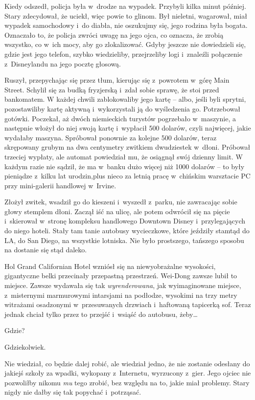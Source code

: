 \documentclass[oneside,polish,11pt,rmheadings]{mwbk}
\begin{document}
Kiedy odszedł, policja była w~drodze na wypadek. Przybyli kilka minut później. Stary zdecydował, że uciekł, więc powie to glinom. Był nieletni, wagarował, miał wypadek samochodowy i~do diabła, nie oszukujmy się, jego rodzina była bogata. Oznaczało to, że policja zwróci uwagę na jego ojca, co oznacza, że zrobią wszystko, co w~ich mocy, aby go zlokalizować. Gdyby jeszcze nie dowiedzieli się, gdzie jest jego telefon, szybko wiedzieliby, przejrzeliby logi i~znaleźli połączenie z~Disneylandu na jego pocztę głosową. 


Ruszył, przepychając się przez tłum, kierując się z~powrotem w~górę Main Street. Schylił się za budką fryzjerską i~zdał sobie sprawę, że stoi przed bankomatem. W każdej chwili zablokowaliby jego kartę -- albo, jeśli byli sprytni, pozostawiliby kartę aktywną i~wykorzystali ją do wyśledzenia go. Potrzebował gotówki. Poczekał, aż dwóch niemieckich turystów pogrzebało w~maszynie, a następnie włożył do niej swoją kartę i~wypłacił 500 dolarów, czyli najwięcej, jakie wydałaby maszyna. Spróbował ponownie za kolejne 500 dolarów, teraz skrępowany grubym na dwa centymetry zwitkiem dwudziestek w~dłoni. Próbował trzeciej wypłaty, ale automat powiedział mu, że osiągnął swój dzienny limit. W każdym razie nie sądził, że ma w~banku dużo więcej niż 1000 dolarów -- to były pieniądze z~kilku lat urodzin,plus nieco za letnią pracę w~chińskim warsztacie PC przy mini-galerii handlowej w~Irvine. 


Złożył zwitek, wsadził go do kieszeni i~wyszedł z~parku, nie zawracając sobie głowy stemplem dłoni. Zaczął iść na ulicę, ale potem odwrócił się na pięcie i~skierował w~stronę kompleksu handlowego Downtown Disney i~przylegających do niego hoteli. Stały tam tanie autobusy wycieczkowe, które jeździły stamtąd do LA, do San Diego, na wszystkie lotniska. Nie było prostszego, tańszego sposobu na dostanie się stąd daleko. 


Hol Grand Californian Hotel wzniósł się na niewyobrażalne wysokości, gigantyczne belki przecinały przepastną przestrzeń. Wei-Dong zawsze lubił to miejsce. Zawsze wydawała się tak \textit{wyrenderowana}, jak wyimaginowane miejsce, z~misternymi marmurowymi intarsjami na podłodze, wysokimi na trzy metry witrażami osadzonymi w~przesuwanych drzwiach i~haftowaną tapicerką sof. Teraz jednak chciał tylko przez to przejść i~wsiąść do autobusu, żeby\ldots  


Gdzie? 


Gdziekolwiek. 


Nie wiedział, co będzie dalej robić, ale wiedział jedno, że nie zostanie odesłany do jakiejś szkoły za wpadki, wykopany z~Internetu, wyrzucony z~gier. Jego ojciec nie pozwoliłby nikomu \textit{mu }tego zrobić, bez względu na to, jakie miał problemy. Stary nigdy nie dałby się tak popychać i~potrząsać. 
\end{document}
